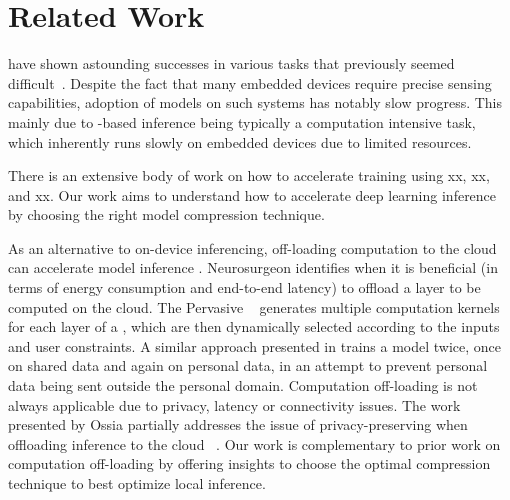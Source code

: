 \section{Related Work}
\DNNs have shown astounding successes in various tasks that previously seemed difficult~\cite{cho2014learning}. Despite the fact that many embedded
devices require precise sensing capabilities, adoption of \DNN models on such systems has notably slow progress. This mainly due to
\DNN-based inference being typically a computation intensive task, which inherently runs slowly on embedded devices due to limited
resources.


There is an extensive body of work on how to accelerate \DNN training using xx, xx, and xx. Our work aims to understand how to accelerate
deep learning inference by choosing the right model compression technique.


As an alternative to on-device inferencing, off-loading computation to the cloud can accelerate \DNN model inference
\cite{teerapittayanon2017distributed}. Neurosurgeon \cite{Kang2017neurosurgeon} identifies when it is beneficial (\eg in terms of energy
consumption and end-to-end latency) to offload a \DNN layer to be computed on the cloud. The Pervasive \CNN~\cite{song2017towards} generates
multiple computation kernels for each layer of a \CNN, which are then dynamically selected according to the inputs and user constraints. A
similar approach presented in \cite{servia2017personal} trains a model twice, once on shared data and again on personal data, in an attempt to
prevent personal data being sent outside the personal domain. Computation off-loading is not always applicable due to privacy, latency or
connectivity issues. The work presented by Ossia \etal partially addresses the issue of privacy-preserving when offloading \DNN inference
to the cloud ~\cite{osia2017hybrid}. Our work is complementary to prior work on computation off-loading by offering insights to choose the
optimal compression technique to best optimize local inference.
